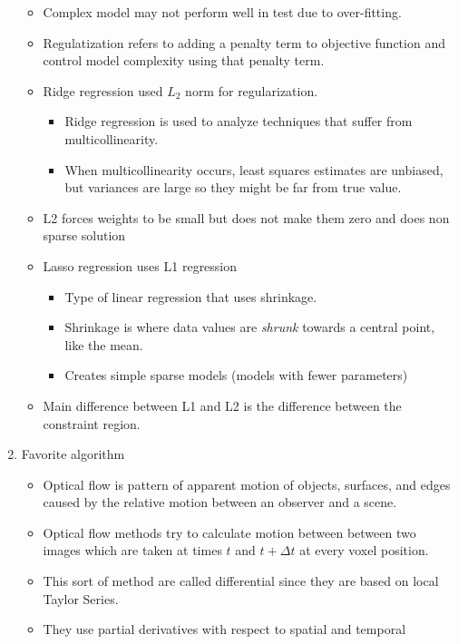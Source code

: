 \documentclass[12pt,a4paper]{article}
\begin{document}
\begin{enumerate}
\begin{itemize}
      \item Complex model may not perform well in test due to over-fitting.
      \item Regulatization refers to adding a penalty term to objective function and control model complexity using 
            that penalty term. 
      \item Ridge regression used $L_2$ norm for regularization.
      \begin{itemize}
        \item Ridge regression is used to analyze techniques that suffer from multicollinearity.
        \item When multicollinearity occurs, least squares estimates are unbiased, but variances are large so they might
              be far from true value.
      \end{itemize}
      \item L2 forces weights to be small but does not make them zero 
            and does non sparse solution
      \item Lasso regression uses L1 regression
      \begin{itemize}
        \item Type of linear regression that uses shrinkage. 
        \item Shrinkage is where data values are \textit{shrunk} towards 
              a central point, like the mean.
        \item Creates simple sparse models (models with fewer parameters)
      \end{itemize}
      \item Main difference between L1 and L2 is the difference between the constraint
            region. 
    \end{itemize}
    \item Favorite algorithm
    \begin{itemize}
      \item Optical flow is pattern of apparent motion of objects, surfaces, 
            and edges caused by the relative motion between an observer and 
            a scene. 
      \item Optical flow methods try to calculate motion between between two 
            images which are taken at times $t$ and $t + \Delta t$ at every
            voxel position. 
      \item This sort of method are called differential since they are based 
            on local Taylor Series.
      \item They use partial derivatives with respect to spatial and temporal 

\end{itemize}
\end{enumerate}
\end{document}
